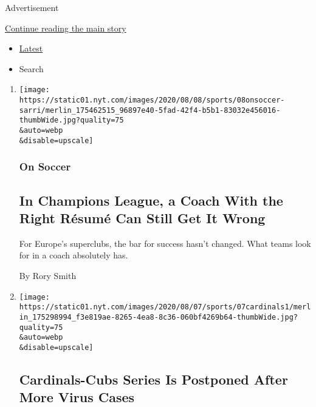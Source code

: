 Advertisement

\protect\hyperlink{after-mid1}{Continue reading the main story}

\begin{itemize}
\tightlist
\item
  \protect\hyperlink{stream-panel}{Latest}
\item
  Search
\end{itemize}

\begin{enumerate}
\def\labelenumi{\arabic{enumi}.}
\item
  \href{/2020/08/08/sports/soccer/juventus-sarri-champions-league.html}{}

  \texttt{[image: https://static01.nyt.com/images/2020/08/08/sports/08onsoccer-sarri/merlin\_175462515\_96897e40-5fad-42f4-b5b1-83032e456016-thumbWide.jpg?quality=75\\\&auto=webp\\\&disable=upscale]}

  \hypertarget{on-soccer}{%
  \subsubsection{On Soccer}\label{on-soccer}}

  \hypertarget{in-champions-league-a-coach-with-the-right-ruxe9sumuxe9-can-still-get-it-wrong}{%
  \subsection{In Champions League, a Coach With the Right Résumé Can
  Still Get It
  Wrong}\label{in-champions-league-a-coach-with-the-right-ruxe9sumuxe9-can-still-get-it-wrong}}

  For Europe's superclubs, the bar for success hasn't changed. What
  teams look for in a coach absolutely has.

  By Rory Smith
\item
  \href{/2020/08/07/sports/baseball/cardinals-game-postponed-coronavirus.html}{}

  \texttt{[image: https://static01.nyt.com/images/2020/08/07/sports/07cardinals1/merlin\_175298994\_f3e819ae-8265-4ea8-8c36-060bf4269b64-thumbWide.jpg?quality=75\\\&auto=webp\\\&disable=upscale]}

  \hypertarget{cardinals-cubs-series-is-postponed-after-more-virus-cases}{%
  \subsection{Cardinals-Cubs Series Is Postponed After More Virus
  Cases}\label{cardinals-cubs-series-is-postponed-after-more-virus-cases}}


\end{enumerate}
